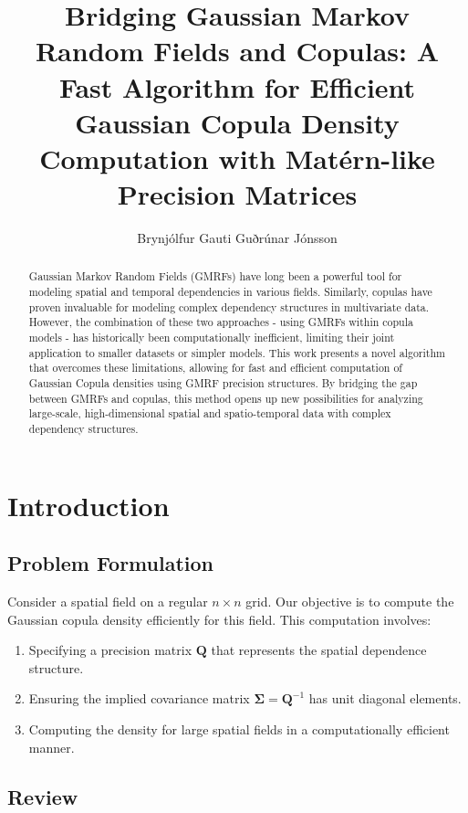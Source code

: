 \documentclass[journal=,manuscript=]{achemso}
\author{Brynjólfur Gauti Guðrúnar Jónsson}
\affiliation{ University of Iceland,  }
\title[]{Bridging Gaussian Markov Random Fields and Copulas: A Fast
Algorithm for Efficient Gaussian Copula Density Computation with
Matérn-like Precision Matrices}
\providecommand{\tightlist}{%
  \setlength{\itemsep}{0pt}\setlength{\parskip}{0pt}}\usepackage{longtable,booktabs,array}
\begin{document}
\maketitle
\begin{abstract}
Gaussian Markov Random Fields (GMRFs) have long been a powerful tool for
modeling spatial and temporal dependencies in various fields. Similarly,
copulas have proven invaluable for modeling complex dependency
structures in multivariate data. However, the combination of these two
approaches - using GMRFs within copula models - has historically been
computationally inefficient, limiting their joint application to smaller
datasets or simpler models. This work presents a novel algorithm that
overcomes these limitations, allowing for fast and efficient computation
of Gaussian Copula densities using GMRF precision structures. By
bridging the gap between GMRFs and copulas, this method opens up new
possibilities for analyzing large-scale, high-dimensional spatial and
spatio-temporal data with complex dependency structures.
\end{abstract}


\section{Introduction}\label{introduction}

\subsection{Problem Formulation}\label{problem-formulation}

Consider a spatial field on a regular \(n \times n\) grid. Our objective
is to compute the Gaussian copula density efficiently for this field.
This computation involves:

\begin{enumerate}
\def\labelenumi{\arabic{enumi}.}
\tightlist
\item
  Specifying a precision matrix \(\mathbf{Q}\) that represents the
  spatial dependence structure.
\item
  Ensuring the implied covariance matrix
  \(\mathbf{\Sigma} = \mathbf{Q}^{-1}\) has unit diagonal elements.
\item
  Computing the density for large spatial fields in a computationally
  efficient manner.
\end{enumerate}

\subsection{Review}\label{review}
\end{document}
